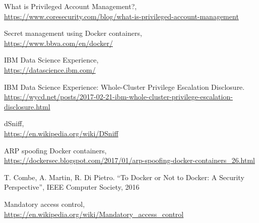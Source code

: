 \documentclass[a4paper,12pt]{article}
\begin{document}
\begin{thebibliography}{99}
What is Privileged Account Management?, \\ \url{https://www.coresecurity.com/blog/what-is-privileged-account-management}

Secret management using Docker containers, \\ \url{https://www.bbva.com/en/docker/}

IBM Data Science Experience, \\ \url{https://datascience.ibm.com/}

IBM Data Science Experience: Whole-Cluster Privilege Escalation Disclosure. \\ \url{https://wycd.net/posts/2017-02-21-ibm-whole-cluster-privilege-escalation-disclosure.html}

dSniff, \\ \url{https://en.wikipedia.org/wiki/DSniff}

ARP spoofing Docker containers, \\ \url{https://dockersec.blogspot.com/2017/01/arp-spoofing-docker-containers_26.html}

T. Combe, A. Martin, R. Di Pietro. ``To Docker or Not to Docker: A Security
Perspective'', IEEE Computer Society, 2016

Mandatory access control, \\ \url{https://en.wikipedia.org/wiki/Mandatory_access_control}

\end{thebibliography}
\end{document}
